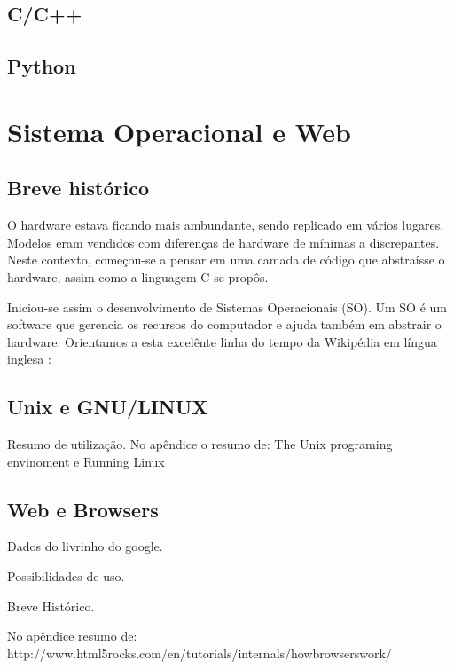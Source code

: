 \subsection{C/C++}

\subsection{Python}


\section{Sistema Operacional e Web}

\subsection{Breve histórico}

O hardware estava ficando mais ambundante, sendo replicado em 
vários lugares. Modelos eram vendidos com diferenças de hardware 
de mínimas a discrepantes. Neste contexto, começou-se a
pensar em uma camada de código que abstraísse o hardware, assim
como a linguagem C se propôs.

Iniciou-se assim o desenvolvimento de Sistemas Operacionais (SO).
Um SO é um software que gerencia os recursos do computador e ajuda
também em abstrair o hardware. Orientamos a esta excelênte linha do
tempo da Wikipédia em língua inglesa \cite{solinhadotempo}:



\subsection{Unix e GNU/LINUX}

Resumo de utilização. No apêndice o resumo de:
The Unix programing envinoment
e
Running Linux

\subsection{Web e Browsers}

Dados do livrinho do google.

Possibilidades de uso.

Breve Histórico.

No apêndice resumo de:
http://www.html5rocks.com/en/tutorials/internals/howbrowserswork/




